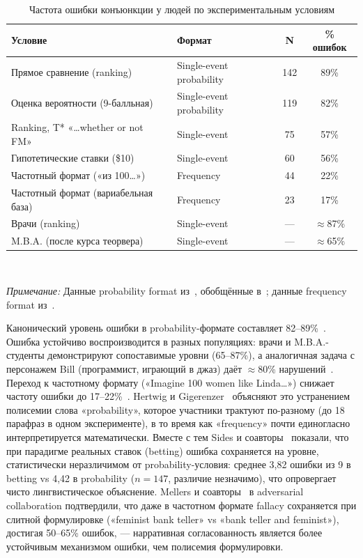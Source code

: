 \begin{table}[h!]
\caption{Частота ошибки конъюнкции у людей по экспериментальным условиям}
\label{tab:human_linda}
\centering
\begin{tabular}{|l|l|c|c|}
\hline
\textbf{Условие} & \textbf{Формат} & \textbf{N} & \textbf{\% ошибок} \\
\hline
Прямое сравнение (ranking)      & Single-event probability & 142 & 89\% \\
Оценка вероятности (9-балльная)  & Single-event probability & 119 & 82\% \\
Ranking, T* «\ldots whether or not FM» & Single-event & 75 & 57\% \\
Гипотетические ставки (\$10)    & Single-event & 60  & 56\% \\
\hline
Частотный формат («из 100\ldots») & Frequency & 44 & 22\% \\
Частотный формат (вариабельная база) & Frequency & 23 & 17\% \\
\hline
Врачи (ranking)                  & Single-event & --- & $\approx$87\% \\
M.B.A. (после курса теорвера)    & Single-event & --- & $\approx$65\% \\
\hline
\end{tabular}
\\[2pt]
\raggedright\footnotesize\textit{Примечание:} Данные probability format из~\cite{tversky1983extensional}, обобщённые в~\cite{gigerenzer1991how}; данные frequency format из~\cite{fiedler1988dependence}.
\end{table}

Канонический уровень ошибки в probability-формате составляет 82--89\%~\cite{tversky1983extensional}. Ошибка устойчиво воспроизводится в разных популяциях: врачи и M.B.A.-студенты демонстрируют сопоставимые уровни (65--87\%), а аналогичная задача с персонажем Bill (программист, играющий в джаз) даёт $\approx$80\% нарушений~\cite{tversky1983extensional}. Переход к частотному формату («Imagine 100 women like Linda\ldots») снижает частоту ошибки до 17--22\%~\cite{fiedler1988dependence, hertwig1999conjunction}. Hertwig и Gigerenzer~\cite{hertwig1999conjunction} объясняют это устранением полисемии слова «probability», которое участники трактуют по-разному (до 18 парафраз в одном эксперименте), в то время как «frequency» почти единогласно интерпретируется математически. Вместе с тем Sides и соавторы~\cite{sides2002reality} показали, что при парадигме реальных ставок (betting) ошибка сохраняется на уровне, статистически неразличимом от probability-условия: среднее 3{,}82 ошибки из 9 в betting vs 4{,}42 в probability ($n = 147$, различие незначимо), что опровергает чисто лингвистическое объяснение. Mellers и соавторы~\cite{mellers2001frequency} в adversarial collaboration подтвердили, что даже в частотном формате fallacy сохраняется при слитной формулировке («feminist bank teller» vs «bank teller and feminist»), достигая 50--65\% ошибок, --- нарративная согласованность является более устойчивым механизмом ошибки, чем полисемия формулировки.

